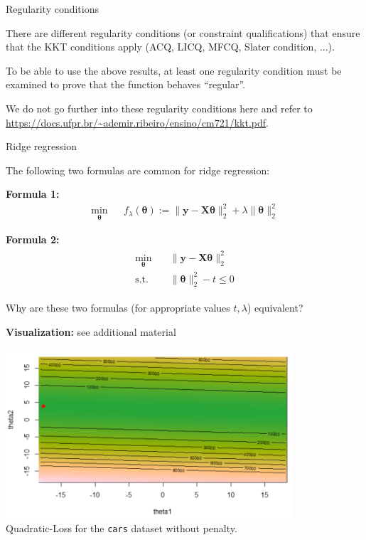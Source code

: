 \documentclass[11pt,compress,t,notes=noshow, xcolor=table]{beamer}
\begin{document}
\begin{vbframe}{Regularity conditions}

There are different regularity conditions (or constraint qualifications) that ensure that the KKT conditions apply (ACQ, LICQ, MFCQ, Slater condition, ...).

\lz

To be able to use the above results, at least one regularity condition must be examined to prove that the function behaves \enquote{regular}.

\lz

We do not go further into these regularity conditions here and refer to \url{https://docs.ufpr.br/~ademir.ribeiro/ensino/cm721/kkt.pdf}.

\end{vbframe}

\begin{vbframe}{Ridge regression}

The following two formulas are common for ridge regression:

\lz
\textbf{Formula 1:}
\begin{eqnarray}
  \min_{\bm{\theta}} && f_\lambda(\bm{\theta}) := \|\bm{y} - \mathbf{X}\bm{\theta}\|_2^2 + \lambda \|\bm{\theta}\|_2^2
\label{eq:form1}
\end{eqnarray}

\vspace*{-0.2cm}
\textbf{Formula 2:}
\begin{align}
\begin{split}
\min_{\bm{\theta}} & \quad \|\bm{y} - \mathbf{X}\bm{\theta}\|_2^2 \\
\text{s.t. } & \quad \|\bm{\theta}\|_2^2 - t \le 0
\end{split}
\label{eq:form2}
\end{align}



Why are these two formulas (for appropriate values $t, \lambda$) equivalent?

\framebreak

\textbf{Visualization:} see additional material

\lz

\begin{center}
\includegraphics[width = 0.8\textwidth]{figure_man/ridge_original.png} \\
Quadratic-Loss for the \texttt{cars} dataset without penalty.
\end{center}


\end{vbframe}
\end{document}
